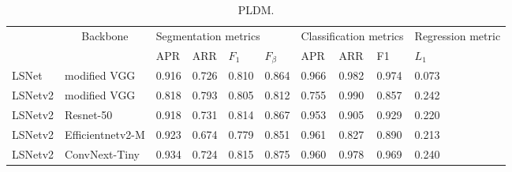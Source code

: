 \documentclass[journal]{IEEEtran}
\begin{document}
\begin{table}[]
  \begin{tabular}{l|l|llll|lll|l}
  \hline
          & \multicolumn{1}{c|}{\multirow{2}{*}{Backbone}} & \multicolumn{4}{l|}{Segmentation metrics} & \multicolumn{3}{l|}{Classification metrics} & Regression metric \\ \cline{3-10} 
          & \multicolumn{1}{c|}{}                          & APR      & ARR      & $F_1$       & $F_{\beta}$    & APR           & ARR          & F1           & $L_1$          \\ \hline
  LSNet   & modified VGG                                   & 0.916    & 0.726    & 0.810       & 0.864          & 0.966         & 0.982        & 0.974        & 0.073          \\
  LSNetv2 & modified VGG                                   & 0.818    & 0.793    & 0.805       & 0.812          & 0.755         & 0.990        & 0.857        & 0.242          \\
  LSNetv2 & Resnet-50                                      & 0.918    & 0.731    & 0.814       & 0.867          & 0.953         & 0.905        & 0.929        & 0.220          \\
  LSNetv2 & Efficientnetv2-M                               & 0.923    & 0.674    & 0.779       & 0.851          & 0.961         & 0.827        & 0.890        & 0.213          \\
  LSNetv2 & ConvNext-Tiny                                  & 0.934    & 0.724    & 0.815       & 0.875          & 0.960         & 0.978        & 0.969        & 0.240            
  \end{tabular}
  \caption{\label{pldm_table}PLDM.}
\end{table}
\end{document}
